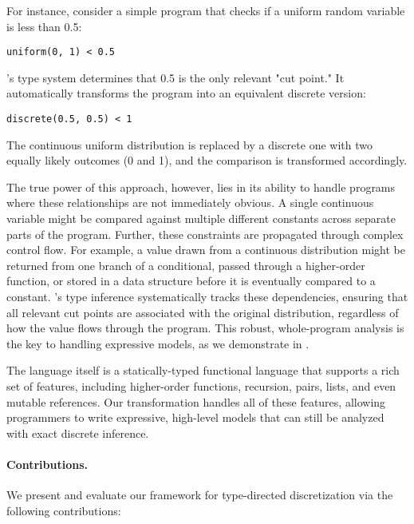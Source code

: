 For instance, consider a simple program that checks if a uniform random variable is less than 0.5:
\begin{lstlisting}[aboveskip=1em,belowskip=1em]
    uniform(0, 1) < 0.5
\end{lstlisting}
\noindent \Slice{}'s type system determines that 0.5 is the only relevant "cut point." It automatically transforms the program into an equivalent discrete version:
\begin{lstlisting}[aboveskip=1em,belowskip=1em]
    discrete(0.5, 0.5) < 1
\end{lstlisting}
\noindent The continuous uniform distribution is replaced by a discrete one with two equally likely outcomes (0 and 1), and the comparison is transformed accordingly.

The true power of this approach, however, lies in its ability to handle programs where these relationships are not immediately obvious. A single continuous variable might be compared against multiple different constants across separate parts of the program. Further, these constraints are propagated through complex control flow. For example, a value drawn from a continuous distribution might be returned from one branch of a conditional, passed through a higher-order function, or stored in a data structure before it is eventually compared to a constant. \Slice{}'s type inference systematically tracks these dependencies, ensuring that all relevant cut points are associated with the original distribution, regardless of how the value flows through the program. This robust, whole-program analysis is the key to handling expressive models, as we demonstrate in .

The \Slice{} language itself is a statically-typed functional language that supports a rich set of features, including higher-order functions, recursion, pairs, lists, and even mutable references. Our transformation handles all of these features, allowing programmers to write expressive, high-level models that can still be analyzed with exact discrete inference.

\paragraph{Contributions.}
We present and evaluate our framework for type-directed discretization via the following contributions:

